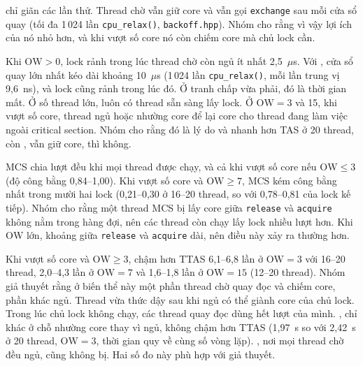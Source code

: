  chỉ giãn các lần thử. Thread chờ vẫn giữ core và vẫn gọi \texttt{exchange} sau
mỗi cửa sổ quay (tối đa 1\,024 lần \texttt{cpu\_relax()}, \texttt{backoff.hpp}). Nhóm cho rằng vì vậy
lợi ích của nó nhỏ hơn, và khi vượt số core nó còn chiếm core mà chủ lock cần.

Khi $\mathrm{OW} > 0$, lock rảnh trong lúc thread chờ còn ngủ ít nhất 2,5~$\mu$s. Với
, cửa sổ quay lớn nhất kéo dài khoảng 10~$\mu$s (1\,024 lần \texttt{cpu\_relax()},
mỗi lần trung vị 9,6~ns), và lock cũng rảnh trong lúc đó. Ở tranh chấp vừa phải, đó là thời gian mất.
Ở số thread lớn, luôn có thread sẵn sàng lấy lock. Ở $\mathrm{OW} = 3$ và 15, khi vượt số core, thread
ngủ hoặc nhường core để lại core cho thread đang làm việc ngoài critical section. Nhóm cho rằng đó là lý
do  và  nhanh hơn TAS ở 20 thread, còn ,
vẫn giữ core, thì không.

MCS chia lượt đều khi mọi thread được chạy, và cả khi vượt số core nếu $\mathrm{OW} \le 3$ (độ công bằng
0,84--1,00). Khi vượt số core và $\mathrm{OW} \ge 7$, MCS kém công bằng nhất trong mười hai lock
(0,21--0,30 ở 16--20 thread, so với 0,78--0,81 của lock kế tiếp). Nhóm cho rằng một thread MCS bị lấy core giữa
\texttt{release} và \texttt{acquire} không nằm trong hàng đợi, nên các thread còn chạy lấy lock nhiều
lượt hơn. Khi $\mathrm{OW}$ lớn, khoảng giữa \texttt{release} và \texttt{acquire} dài, nên điều này xảy
ra thường hơn.

Khi vượt số core và $\mathrm{OW} \ge 3$,  chậm hơn TTAS 6,1--6,8 lần ở
$\mathrm{OW} = 3$ với 16--20 thread, 2,0--4,3 lần ở $\mathrm{OW} = 7$ và 1,6--1,8 lần ở
$\mathrm{OW} = 15$ (12--20 thread). Nhóm giả thuyết rằng ở biến thể này một phần thread chờ quay đọc và
chiếm core, phần khác ngủ. Thread vừa thức dậy sau khi ngủ có thể giành core của chủ lock. Trong lúc chủ
lock không chạy, các thread quay đọc dùng hết lượt của mình. , chỉ khác ở chỗ
nhường core thay vì ngủ, không chậm hơn TTAS (1,97~s so với 2,42~s ở 20 thread, $\mathrm{OW} = 3$, thời
gian quy về cùng số vòng lặp). , nơi mọi thread chờ đều ngủ, cũng không bị. Hai
số đo này phù hợp với giả thuyết.

